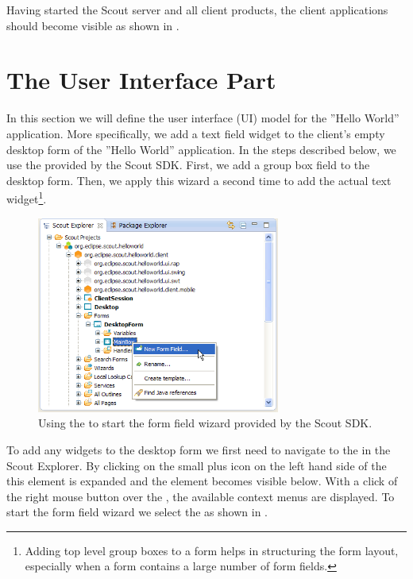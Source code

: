 \documentclass[a4paper,10pt,twoside]{book}
\begin{document}
Having started the Scout server and all client products, the client applications should become visible as shown in .

\section{The User Interface Part}

In this section we will define the user interface (UI) model for the ''Hello World'' application.
More specifically, we add a text field widget to the client's empty desktop form of the ''Hello World'' application.
In the steps described below, we use the  provided by the Scout SDK. 
First, we add a group box field to the desktop form.
Then, we apply this wizard a second time to add the actual text widget\footnote{
Adding top level group boxes to a form helps in structuring the form layout, especially when a form contains a large number of form fields.
}.

\begin{figure}
\includegraphics[width=8cm]{sdk_new_field_wizard_menu.png} 
\caption{Using the  to start the form field wizard provided by the Scout SDK.}
\end{figure}

To add any widgets to the desktop form we first need to navigate to the  in the Scout Explorer.
By clicking on the small plus icon on the left hand side of the  this element is expanded and the  element becomes visible below.
With a click of the right mouse button over the , the available context menus are displayed.
To start the form field wizard we select the  as shown in .
\end{document}
